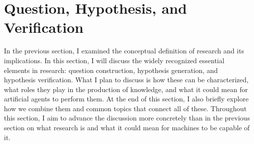 

\section{Question, Hypothesis, and  Verification}
\label{section-question-hypothesis-verification}
In the previous section, I examined the conceptual definition of research and its implications. In this section, I will discuss the widely recognized essential elements in research: question construction, hypothesis generation, and hypothesis verification. What I plan to discuss is how these can be characterized, what roles they play in the production of knowledge, and what it could mean for artificial agents to perform them. At the end of this section, I also briefly explore how we combine them and common topics that connect all of these. Throughout this section, I aim to advance the discussion more concretely than in the previous section on what research is and what it could mean for machines to be capable of it.




